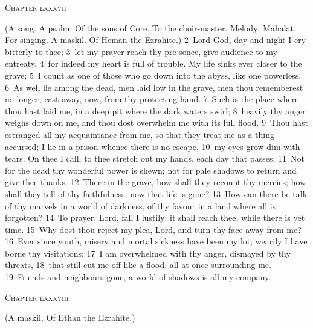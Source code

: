 \documentclass[10pt]{book} %
\begin{document}
\begin{large}\begin{center}\textsc{Chapter lxxxvii}\end{center}\end{large}
(A song. A psalm. Of the sons of Core. To the choir-master. Melody: Mahalat. For singing. A maskil. Of Heman the Ezrahite.)
\textcolor{benred8}{2}~Lord God, day and night I cry bitterly to thee; \textcolor{benred8}{3}~let my prayer reach thy pre-sence, give audience to my entreaty, \textcolor{benred8}{4}~for indeed my heart is full of trouble. My life sinks ever closer to the grave; \textcolor{benred8}{5}~I count as one of those who go down into the abyss, like one powerless. \textcolor{benred8}{6}~As well lie among the dead, men laid low in the grave, men thou rememberest no longer, cast away, now, from thy protecting hand. \textcolor{benred8}{7}~Such is the place where thou hast laid me, in a deep pit where the dark waters swirl; \textcolor{benred8}{8}~heavily thy anger weighs down on me, and thou dost overwhelm me with its full flood. \textcolor{benred8}{9}~Thou hast estranged all my acquaintance from me, so that they treat me as a thing accursed; I lie in a prison whence there is no escape, \textcolor{benred8}{10}~my eyes grow dim with tears. On thee I call, to thee stretch out my hands, each day that passes.
\textcolor{benred8}{11}~Not for the dead thy wonderful power is shewn; not for pale shadows to return and give thee thanks. \textcolor{benred8}{12}~There in the grave, how shall they recount thy mercies; how shall they tell of thy faithfulness, now that life is gone? \textcolor{benred8}{13}~How can there be talk of thy marvels in a world of darkness, of thy favour in a land where all is forgotten? \textcolor{benred8}{14}~To prayer, Lord, fall I lustily; it shall reach thee, while there is yet time. \textcolor{benred8}{15}~Why dost thou reject my plea, Lord, and turn thy face away from me? \textcolor{benred8}{16}~Ever since youth, misery and mortal sickness have been my lot; wearily I have borne thy visitations; \textcolor{benred8}{17}~I am overwhelmed with thy anger, dismayed by thy threats, \textcolor{benred8}{18}~that still cut me off like a flood, all at once surrounding me. \textcolor{benred8}{19}~Friends and neighbours gone, a world of shadows is all my company.
\begin{large}\begin{center}\textsc{Chapter lxxxviii}\end{center}\end{large}
(A maskil. Of Ethan the Ezrahite.)
\end{document}
